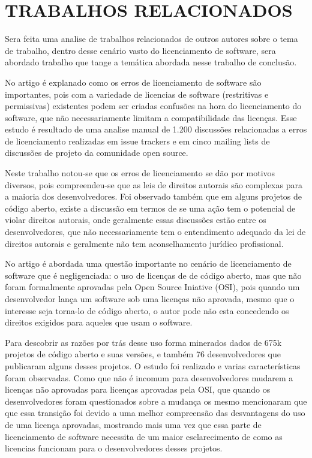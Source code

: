 
\chapter{TRABALHOS RELACIONADOS}
\label{chap:fundamentacaoTeorica}
Sera feita uma analise de trabalhos relacionados de outros autores sobre o tema de trabalho, dentro desse cenário vasto do licenciamento de software, sera abordado trabalho que tange a temática abordada nesse trabalho de conclusão.

No artigo \cite{Vendome:2018:DDW:3180155.3180221} é explanado como os erros de licenciamento de software são importantes, pois com a variedade de licencias de software (restritivas e permissivas) existentes podem ser criadas confusões na hora do licenciamento do software, que não necessariamente limitam a compatibilidade das licenças. Esse estudo é resultado de uma analise manual de 1.200 discussões relacionadas a erros de licenciamento realizadas em issue trackers e em cinco mailing lists de discussões de projeto da comunidade open source. 

Neste trabalho notou-se que os erros de licenciamento se dão por motivos diversos, pois compreendeu-se que as leis de direitos autorais são complexas para a maioria dos desenvolvedores. Foi observado também que em alguns projetos de código aberto, existe a discussão em termos de se uma ação tem o potencial de violar direitos autorais, onde geralmente essas discussões estão entre os desenvolvedores, que não necessariamente tem o entendimento adequado da lei de direitos autorais e geralmente não tem aconselhamento jurídico profissional. 

No artigo \cite{Meloca:2018:UUI:3196398.3196427} é abordada uma questão importante no cenário de licenciamento de software que é negligenciada: o uso de licenças de de código aberto, mas que não foram formalmente aprovadas pela Open Source Iniative (OSI), pois quando um desenvolvedor lança um software sob uma licenças não aprovada, mesmo que o interesse seja torna-lo de código aberto, o  autor pode não esta concedendo os direitos exigidos para aqueles que usam o software. 

Para descobrir as razões por trás desse uso forma minerados dados de 675k projetos de código aberto e suas versões, e também 76 desenvolvedores que publicaram alguns desses projetos. O estudo foi realizado e varias características foram observadas. Como que não é incomum para desenvolvedores mudarem a licenças não aprovadas para licenças aprovadas pela OSI, que quando os desenvolvedores foram questionados sobre a mudança os mesmo mencionaram que que essa transição foi devido a uma melhor compreensão das desvantagens do uso de uma licença aprovadas, mostrando mais uma vez que essa parte de licenciamento de software necessita de um maior esclarecimento de como as licencias funcionam para o desenvolvedores desses projetos.

